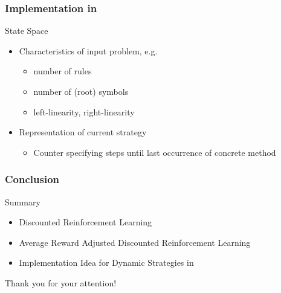 \documentclass[xcolor=table%
,t]{beamer}
\begin{document}
\begin{frame}
  \frametitle{Implementation in \tct{}}

  \begin{block}{State Space}
    \begin{itemize}
    \item Characteristics of input problem, e.g.
      \begin{itemize}
      \item number of rules
      \item number of (root) symbols
      \item left-linearity, right-linearity
      \end{itemize}
    \item Representation of current strategy 
      \begin{itemize}
      \item Counter specifying steps until last occurrence of concrete method
      \end{itemize}
    \end{itemize}
  \end{block}
\end{frame}

\begin{frame}
  \frametitle{Conclusion}

  \begin{block}{Summary}
    \begin{itemize}
    \item Discounted Reinforcement Learning
    \item Average Reward Adjusted Discounted Reinforcement Learning
    \item Implementation Idea for Dynamic Strategies in \tct{}
    \end{itemize}
  \end{block}\pause

  
  \begin{block}{}
    \centering
    Thank you for your attention!
  \end{block}


\end{frame}
\end{document}
